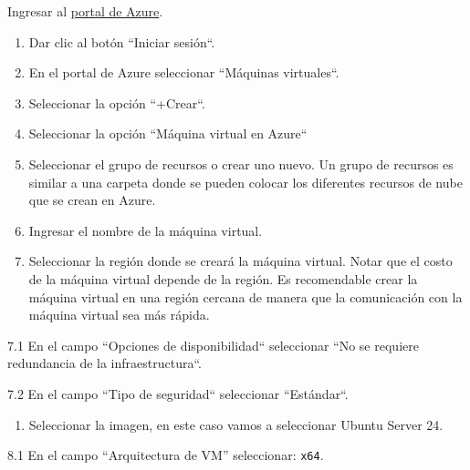 Ingresar al \href{https://azure.microsoft.com/es-mx/features/azure-portal/}{portal de Azure}.

\begin{enumerate}

\item Dar clic al botón ``Iniciar sesión``.

\item En el portal de Azure seleccionar ``Máquinas virtuales``.

\item Seleccionar la opción ``+Crear``.

\item Seleccionar la opción ``Máquina virtual en Azure``

\item Seleccionar el grupo de recursos o crear uno nuevo. Un grupo de recursos es similar a una carpeta donde se pueden colocar los diferentes recursos de nube que se crean en Azure.

\item Ingresar el nombre de la máquina virtual.

\item Seleccionar la región donde se creará la máquina virtual. Notar que el costo de la máquina virtual depende de la región. Es recomendable crear la máquina virtual en una región cercana de manera que la comunicación con la máquina virtual sea más rápida.

\end{enumerate}

7.1 En el campo ``Opciones de disponibilidad`` seleccionar ``No se requiere redundancia de la infraestructura``.

7.2 En el campo ``Tipo de seguridad`` seleccionar ``Estándar``.

\begin{enumerate}

\item Seleccionar la imagen, en este caso vamos a seleccionar Ubuntu Server 24.

\end{enumerate}

8.1 En el campo ``Arquitectura de VM'' seleccionar: \texttt{x64}.

